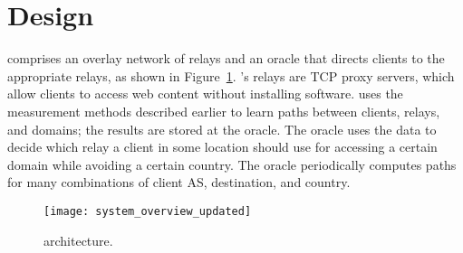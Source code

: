 \section{Design}
\label{system_design}

\system{} comprises an overlay network of relays and an oracle that
directs clients to the appropriate relays, as shown in
Figure~\ref{fig:arch}.  \system{}'s relays are TCP proxy servers,
which allow clients to access web content without installing software.
\system{} uses the
measurement methods described earlier to learn paths between
clients, relays, and domains; the results are stored at the
oracle.  The oracle uses the data to decide which relay a client in
some location should use for accessing a certain domain while avoiding
a certain country.  The oracle periodically computes paths for many
combinations of client AS, destination, and country.
%



\begin{figure}[t!]
    \centering
        \texttt{[image: system\_overview\_updated]}
        \caption{\system{} architecture.}
        \label{fig:arch}
\end{figure}

